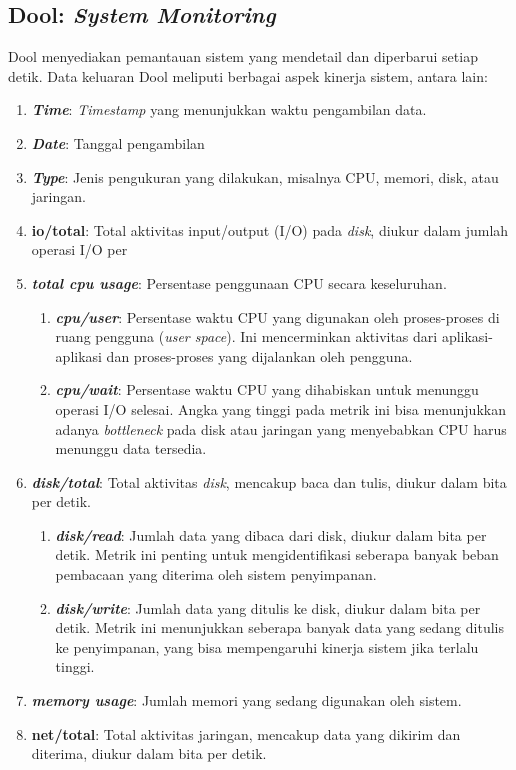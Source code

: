 \subsection{Dool: \textit{System Monitoring}}
Dool menyediakan pemantauan sistem yang mendetail dan diperbarui setiap detik. Data keluaran Dool meliputi berbagai aspek kinerja sistem, antara lain:
\begin{enumerate}
	\item \textbf{\textit{Time}}: \textit{Timestamp} yang menunjukkan waktu pengambilan data.
	\item \textbf{\textit{Date}}: Tanggal pengambilan 
	\item \textbf{\textit{Type}}: Jenis pengukuran yang dilakukan, misalnya CPU, memori, disk, atau jaringan. 
	\item \textbf{io/total}: Total aktivitas input/output (I/O) pada \textit{disk}, diukur dalam jumlah operasi I/O per 
	\item \textbf{\textit{total cpu usage}}: Persentase penggunaan CPU secara keseluruhan. 
		\begin{enumerate}
		\item \textbf{\textit{cpu/user}}: Persentase waktu CPU yang digunakan oleh proses-proses di ruang pengguna (\textit{user space}). Ini mencerminkan aktivitas dari aplikasi-aplikasi dan proses-proses yang dijalankan oleh pengguna.
		\item \textbf{\textit{cpu/wait}}: Persentase waktu CPU yang dihabiskan untuk menunggu operasi I/O selesai. Angka yang tinggi pada metrik ini bisa menunjukkan adanya \textit{bottleneck} pada disk atau jaringan yang menyebabkan CPU harus menunggu data tersedia.
		\end{enumerate}
	\item \textbf{\textit{disk/total}}: Total aktivitas \textit{disk}, mencakup baca dan tulis, diukur dalam bita per detik.
		\begin{enumerate}
		\item \textbf{\textit{disk/read}}: Jumlah data yang dibaca dari disk, diukur dalam bita per detik. Metrik ini penting untuk mengidentifikasi seberapa banyak beban pembacaan yang diterima oleh sistem penyimpanan.
		\item \textbf{\textit{disk/write}}: Jumlah data yang ditulis ke disk, diukur dalam bita per detik. Metrik ini menunjukkan seberapa banyak data yang sedang ditulis ke penyimpanan, yang bisa mempengaruhi kinerja sistem jika terlalu tinggi.
		\end{enumerate}
	\item \textbf{\textit{memory usage}}: Jumlah memori yang sedang digunakan oleh sistem.
	\item \textbf{net/total}: Total aktivitas jaringan, mencakup data yang dikirim dan diterima, diukur dalam bita per detik.
\end{enumerate}

